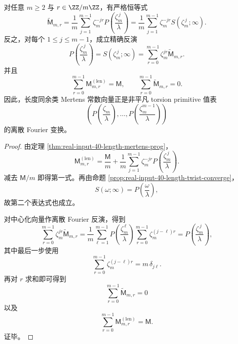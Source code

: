 \begin{theorem}\label{thm:conclusion-length-congruence-mertens-torsion-fourier-tomography}
对任意 \(m\ge 2\) 与 \(r\in \ZZ/m\ZZ\)，有严格恒等式
\[
\widetilde{\mathsf M}_{m,r}
=
\frac1m\sum_{j=1}^{m-1}\zeta_m^{-jr}P\!\left(\frac{\zeta_m^{\,j}}{\lambda}\right)
=
\frac1m\sum_{j=1}^{m-1}\zeta_m^{-jr}S(\zeta_m^{\,j};\infty).
\]
反之，对每个 \(1\le j\le m-1\)，成立精确反演
\[
P\!\left(\frac{\zeta_m^{\,j}}{\lambda}\right)
=
S(\zeta_m^{\,j};\infty)
=
\sum_{r=0}^{m-1}\zeta_m^{jr}\widetilde{\mathsf M}_{m,r}.
\]
并且
\[
\sum_{r=0}^{m-1}\mathsf M_{m,r}^{(\mathrm{len})}=\mathsf M,
\qquad
\sum_{r=0}^{m-1}\widetilde{\mathsf M}_{m,r}=0.
\]
因此，长度同余类 Mertens 常数向量正是非平凡 torsion primitive 值表
\[
\left(P\!\left(\frac{\zeta_m}{\lambda}\right),\dots,P\!\left(\frac{\zeta_m^{m-1}}{\lambda}\right)\right)
\]
的离散 Fourier 变换。
\end{theorem}
\begin{proof}
由定理 \ref{thm:real-input-40-length-mertens-prog}，
\[
\mathsf M_{m,r}^{(\mathrm{len})}
=
\frac{\mathsf M}{m}
+
\frac1m\sum_{j=1}^{m-1}\zeta_m^{-jr}P\!\left(\frac{\zeta_m^{\,j}}{\lambda}\right).
\]
减去 \(\mathsf M/m\) 即得第一式。再由命题 \ref{prop:real-input-40-length-twist-converge}，
\[
S(\omega;\infty)=P\!\left(\frac{\omega}{\lambda}\right),
\]
故第二个表达式也成立。

对中心化向量作离散 Fourier 反演，得到
\[
\sum_{r=0}^{m-1}\zeta_m^{jr}\widetilde{\mathsf M}_{m,r}
=
\frac1m\sum_{\ell=1}^{m-1}P\!\left(\frac{\zeta_m^{\,\ell}}{\lambda}\right)
\sum_{r=0}^{m-1}\zeta_m^{(j-\ell)r}
=
P\!\left(\frac{\zeta_m^{\,j}}{\lambda}\right),
\]
其中最后一步使用
\[
\sum_{r=0}^{m-1}\zeta_m^{(j-\ell)r}=m\,\delta_{j\ell}.
\]
再对 \(r\) 求和即可得到
\[
\sum_{r=0}^{m-1}\widetilde{\mathsf M}_{m,r}=0
\]
以及
\[
\sum_{r=0}^{m-1}\mathsf M_{m,r}^{(\mathrm{len})}=\mathsf M.
\]
证毕。
\end{proof}

